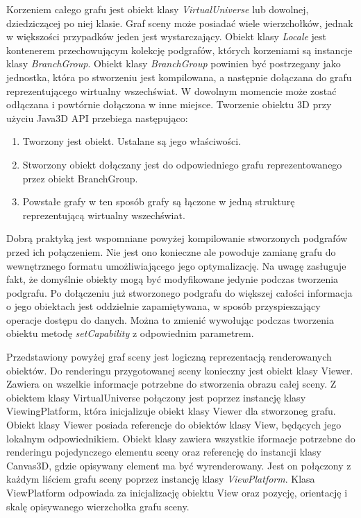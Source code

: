 Korzeniem całego grafu jest obiekt klasy \textit{VirtualUniverse} lub dowolnej, dziedziczącej po niej klasie. Graf sceny może posiadać wiele wierzchołków, jednak w większości przypadków jeden jest wystarczający. Obiekt klasy \textit{Locale} jest kontenerem przechowującym kolekcję podgrafów, których korzeniami są instancje klasy \textit {BranchGroup}. Obiekt klasy \textit{BranchGroup} powinien być postrzegany jako jednostka, która po stworzeniu jest kompilowana, a następnie dołączana do grafu reprezentującego wirtualny wszechświat. W dowolnym momencie może zostać odłączana i powtórnie dołączona w inne miejsce.
Tworzenie obiektu 3D przy użyciu Java3D API przebiega następująco:
\begin{enumerate}
\item Tworzony jest obiekt. Ustalane są jego właściwości.
\item Stworzony obiekt dołączany jest do odpowiedniego grafu reprezentowanego przez obiekt BranchGroup.
\item Powstałe grafy w ten sposób grafy są łączone w jedną strukturę reprezentującą wirtualny wszechświat.
\end{enumerate}
Dobrą praktyką jest wspomniane powyżej kompilowanie stworzonych podgrafów przed ich połączeniem. Nie jest ono konieczne ale powoduje  zamianę grafu do wewnętrznego formatu umożliwiającego jego optymalizację. Na uwagę zasługuje fakt, że domyślnie obiekty mogą być modyfikowane jedynie podczas tworzenia podgrafu. Po dołączeniu już stworzonego podgrafu do większej całości informacja o jego obiektach jest oddzielnie zapamiętywana, w sposób przyspieszający operacje dostępu do danych. Można to zmienić wywołując podczas tworzenia obiektu metodę \textit{setCapability} z odpowiednim parametrem.

Przedstawiony powyżej graf sceny jest logiczną reprezentacją renderowanych obiektów.
Do renderingu przygotowanej sceny konieczny jest obiekt klasy Viewer.
Zawiera on wszelkie informacje potrzebne do stworzenia obrazu całej sceny. Z obiektem klasy VirtualUniverse połączony jest
poprzez instancję klasy ViewingPlatform, która inicjalizuje obiekt klasy Viewer dla stworzoneg grafu.
Obiekt klasy Viewer posiada referencje do obiektów klasy View, będących jego lokalnym odpowiednikiem.
Obiekt klasy  zawiera wszystkie iformacje potrzebne do renderingu pojedynczego elementu sceny oraz referencję do instancji klasy Canvas3D, gdzie opisywany element ma być wyrenderowany.
Jest on połączony z każdym liściem grafu sceny poprzez instancję klasy \textit {ViewPlatform}.
Klasa ViewPlatform odpowiada za inicjalizację obiektu View oraz pozycję, orientację i skalę opisywanego wierzchołka grafu sceny.

